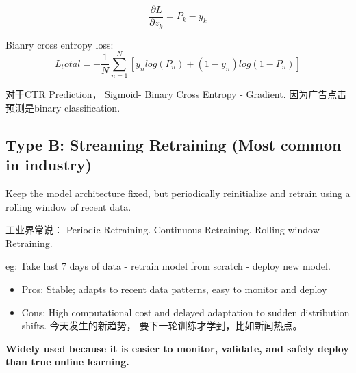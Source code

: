 \begin{equation}
    \frac{\partial L}{\partial z_k}=P_k-y_k
\end{equation}



Bianry cross entropy loss:
\begin{equation}
    L_total = -\frac{1}{N} \sum_{n = 1}^{N} [y_n log(P_n) + (1-y_n) log(1-P_n)]   
\end{equation}


对于CTR Prediction， Sigmoid- Binary Cross Entropy - Gradient. 因为广告点击预测是binary classification.


\subsection{Type B: Streaming Retraining (Most common in industry)}
Keep the model architecture fixed, but periodically reinitialize and retrain using a rolling window of recent data.

工业界常说： Periodic Retraining. Continuous Retraining. Rolling window Retraining.

eg: Take last 7 days of data - retrain model from scratch - deploy new model.
\begin{itemize}
    \item Pros: Stable; adapts to recent data patterns, easy to monitor and deploy
    \item Cons: High computational cost and delayed adaptation to sudden distribution shifts.
 今天发生的新趋势， 要下一轮训练才学到，比如新闻热点。
\end{itemize}

 \textbf{Widely used because it is easier to monitor, validate, and safely deploy than true online learning.}

% 
